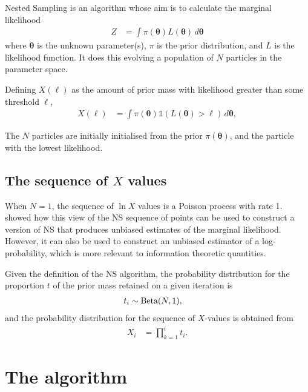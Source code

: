 \documentclass[entropy,article,accept,oneauthor,pdftex,10pt,a4paper]{mdpi}
\newcommand{\x}{\boldsymbol{\theta}}
\begin{document}
Nested Sampling \citep[NS][]{skilling2006nested} is an algorithm whose aim is
to calculate the marginal likelihood
\begin{align}
Z &= \int \pi(\x) L(\x) \, d\x
\end{align}
where $\x$ is the unknown parameter(s), $\pi$ is the prior distribution,
and $L$ is the likelihood function. It does this evolving a population of
$N$ particles in the parameter space.

Defining $X(\ell)$ as the amount of prior mass with likelihood greater than
some threshold $\ell$,
\begin{align}
X(\ell) &= \int \pi(\x) \mathds{1}\left(L(\x) > \ell\right) \, d\x,
\end{align} 

The $N$ particles are initially initialised from the prior $\pi(\x)$, and the
particle with the lowest likelihood.

\subsection{The sequence of $X$ values}

When $N=1$, the sequence of $\ln X$ values is a Poisson process with rate
1. \citet{Walter2015} showed how this view of the NS sequence of points
can be used to construct a
version of NS that produces unbiased estimates of the marginal likelihood.
However, it can also be used to construct an unbiased estimator of
a log-probability, which is more relevant to information theoretic
quantities.

Given the definition of the NS algorithm,
the probability distribution for the proportion $t$ of the prior mass
retained on a given iteration is
\begin{align}
t_i &\sim \textnormal{Beta}(N, 1),
\end{align}
and the probability distribution for the sequence of $X$-values is
obtained from
\begin{align}
X_i &= \prod_{k=1}^i t_i.
\end{align}

\section{The algorithm}
\end{document}
